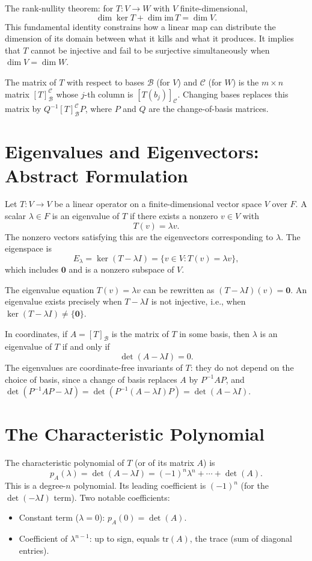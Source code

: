 \documentclass[11pt]{article}
\begin{document}
The rank-nullity theorem: for $T: V \to W$ with $V$ finite-dimensional,
\[
\dim \ker T + \dim \text{im}\, T = \dim V.
\]
This fundamental identity constrains how a linear map can distribute the dimension of its domain between what it kills and what it produces. It implies that $T$ cannot be injective and fail to be surjective simultaneously when $\dim V = \dim W$.

The matrix of $T$ with respect to bases $\mathcal{B}$ (for $V$) and $\mathcal{C}$ (for $W$) is the $m \times n$ matrix $[T]_{\mathcal{B}}^{\mathcal{C}}$ whose $j$-th column is $[T(b_j)]_\mathcal{C}$. Changing bases replaces this matrix by $Q^{-1} [T]_{\mathcal{B}}^{\mathcal{C}} P$, where $P$ and $Q$ are the change-of-basis matrices.

\section*{Eigenvalues and Eigenvectors: Abstract Formulation}

Let $T: V \to V$ be a linear operator on a finite-dimensional vector space $V$ over $F$. A scalar $\lambda \in F$ is an eigenvalue of $T$ if there exists a nonzero $v \in V$ with
\[
T(v) = \lambda v.
\]
The nonzero vectors satisfying this are the eigenvectors corresponding to $\lambda$. The eigenspace is
\[
E_\lambda = \ker(T - \lambda I) = \{v \in V : T(v) = \lambda v\},
\]
which includes $\mathbf{0}$ and is a nonzero subspace of $V$.

The eigenvalue equation $T(v) = \lambda v$ can be rewritten as $(T - \lambda I)(v) = \mathbf{0}$. An eigenvalue exists precisely when $T - \lambda I$ is not injective, i.e., when $\ker(T - \lambda I) \neq \{\mathbf{0}\}$.

In coordinates, if $A = [T]_\mathcal{B}$ is the matrix of $T$ in some basis, then $\lambda$ is an eigenvalue of $T$ if and only if
\[
\det(A - \lambda I) = 0.
\]
The eigenvalues are coordinate-free invariants of $T$: they do not depend on the choice of basis, since a change of basis replaces $A$ by $P^{-1}AP$, and $\det(P^{-1}AP - \lambda I) = \det(P^{-1}(A-\lambda I)P) = \det(A - \lambda I)$.

\section*{The Characteristic Polynomial}

The characteristic polynomial of $T$ (or of its matrix $A$) is
\[
p_A(\lambda) = \det(A - \lambda I) = (-1)^n \lambda^n + \cdots + \det(A).
\]
This is a degree-$n$ polynomial. Its leading coefficient is $(-1)^n$ (for the $\det(-\lambda I)$ term). Two notable coefficients:
\begin{itemize}
  \item Constant term ($\lambda = 0$): $p_A(0) = \det(A)$.
  \item Coefficient of $\lambda^{n-1}$: up to sign, equals $\text{tr}(A)$, the trace (sum of diagonal entries).
\end{itemize}
\end{document}
